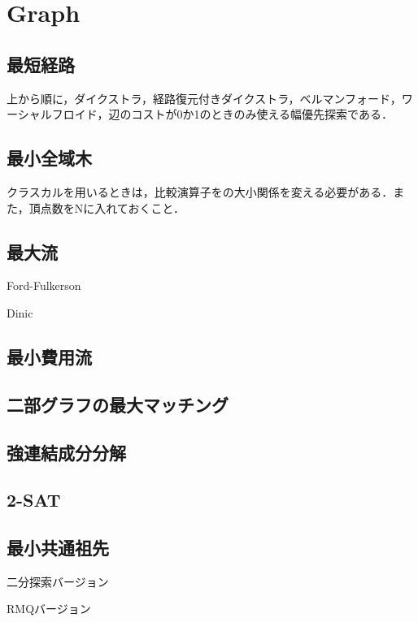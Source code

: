 \section{Graph}

\subsection{最短経路}
上から順に，ダイクストラ，経路復元付きダイクストラ，ベルマンフォード，ワーシャルフロイド，辺のコストが0か1のときのみ使える幅優先探索である．


\subsection{最小全域木}
クラスカルを用いるときは，比較演算子をの大小関係を変える必要がある．また，頂点数をNに入れておくこと．


\subsection{最大流}
Ford-Fulkerson

Dinic


\subsection{最小費用流}


\subsection{二部グラフの最大マッチング}


\subsection{強連結成分分解}


\subsection{2-SAT}


\subsection{最小共通祖先}
二分探索バージョン

RMQバージョン


